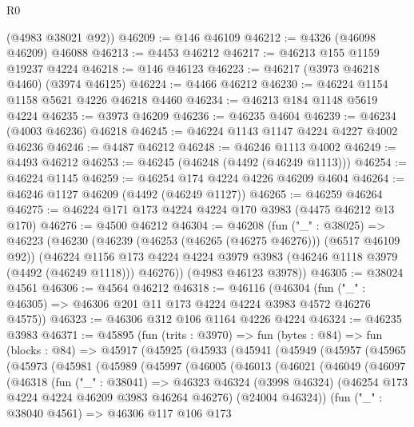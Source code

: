 \begin{lexlean}{R0}
\begin{coremodule}
      (@4983 @38021 @92))
@46209 := @146 @46109
@46212 := @4326 (@46098 @46209) @46088
@46213 := @4453 @46212
@46217 := @46213 @155 @1159 @19237 @4224
@46218 := @146 @46123
@46223 := @46217 (@3973 @46218 @4460) (@3974 @46125)
@46224 := @4466 @46212
@46230 := @46224 @1154 @1158 @5621 @4226 @46218 @4460
@46234 := @46213 @184 @1148 @5619 @4224
@46235 := @3973 @46209
@46236 := @46235 @4604
@46239 := @46234 (@4003 @46236) @46218
@46245 := @46224 @1143 @1147 @4224 @4227 @4002 @46236
@46246 := @4487 @46212
@46248 := @46246 @1113 @4002
@46249 := @4493 @46212
@46253 := @46245 (@46248 (@4492 (@46249 @1113)))
@46254 := @46224 @1145
@46259 := @46254 @174 @4224 @4226 @46209 @4604
@46264 := @46246 @1127 @46209 (@4492 (@46249 @1127))
@46265 := @46259 @46264
@46275 := @46224 @171 @173 @4224 @4224 @170 @3983 (@4475 @46212 @13 @170)
@46276 := @4500 @46212
@46304 := @46208
    (fun ("_" : @38025) =>
    @46223
      (@46230
        (@46239 (@46253 (@46265 (@46275 @46276))) (@6517 @46109 @92))
        (@46224
          @1156
          @173
          @4224
          @4224
          @3979
          @3983
          (@46246 @1118 @3979 (@4492 (@46249 @1118)))
          @46276))
      (@4983 @46123 @3978))
@46305 := @38024 @4561
@46306 := @4564 @46212
@46318 := @46116
    (@46304 (fun ("_" : @46305) => @46306 @201 @11 @173 @4224 @4224 @3983 @4572 @46276 @4575))
@46323 := @46306 @312 @106 @1164 @4226 @4224
@46324 := @46235 @3983
@46371 := @45895
    (fun (trits : @3970) =>
    fun (bytes : @84) =>
    fun (blocks : @84) =>
    @45917
      (@45925
        (@45933
          (@45941
            (@45949
              (@45957
                (@45965
                  (@45973
                    (@45981
                      (@45989
                        (@45997
                          (@46005
                            (@46013
                              (@46021
                                (@46049
                                  (@46097
                                    (@46318
                                      (fun ("_" : @38041) =>
                                      @46323
                                        @46324
                                        (@3998 @46324)
                                        (@46254 @173 @4224 @4224 @46209 @3983 @46264 @46276)
                                        (@24004 @46324))
                                      (fun ("_" : @38040 @4561) =>
                                      @46306
                                        @117
                                        @106
                                        @173

\end{coremodule}
\end{lexlean}
